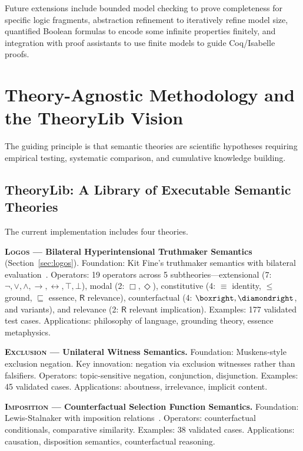 \documentclass[pdflatex,sn-mathphys-num]{sn-jnl}
\newcommand{\nec}{\Box}                     %
\newcommand{\poss}{\Diamond}                %
\newcommand{\imp}{\to}                      %
\newcommand{\lneg}{\neg}                    %
\newcommand{\ground}{\leq}                  %
\newcommand{\essence}{\sqsubseteq}          %
\newcommand{\propident}{\equiv}             %
\newcommand{\relimpl}{\mathsf{R}}           %
\newcommand{\theorylogos}{\textsc{Logos}}
\newcommand{\theoryexclusion}{\textsc{Exclusion}}
\newcommand{\theoryimposition}{\textsc{Imposition}}
\theoremstyle{thmstyleone}
\theoremstyle{thmstyletwo}
\theoremstyle{thmstylethree}
\begin{document}
Future extensions include bounded model checking to prove completeness for specific logic fragments, abstraction refinement to iteratively refine model size, quantified Boolean formulas to encode some infinite properties finitely, and integration with proof assistants to use finite models to guide Coq/Isabelle proofs.


\section{Theory-Agnostic Methodology and the TheoryLib Vision}\label{sec:theorylib}

The guiding principle is that semantic theories are scientific hypotheses requiring empirical testing, systematic comparison, and cumulative knowledge building.

\subsection{TheoryLib: A Library of Executable Semantic Theories}\label{sec:theorylib-library}

The current implementation includes four theories.

\textbf{\theorylogos{} --- Bilateral Hyperintensional Truthmaker Semantics} (Section~\ref{sec:logos}).
Foundation: Kit Fine's truthmaker semantics with bilateral evaluation~\cite{fine2017tms,fine2017content}.
Operators: 19 operators across 5 subtheories---extensional (7: $\lneg, \lor, \land, \imp, \leftrightarrow, \top, \bot$), modal (2: $\nec, \poss$), constitutive (4: $\propident$ identity, $\ground$ ground, $\essence$ essence, $\relimpl$ relevance), counterfactual (4: $\boxright, \diamondright$, and variants), and relevance (2: $\relimpl$ relevant implication).
Examples: 177 validated test cases.
Applications: philosophy of language, grounding theory, essence metaphysics.

\textbf{\theoryexclusion{} --- Unilateral Witness Semantics.}
Foundation: Muskens-style exclusion negation.
Key innovation: negation via exclusion witnesses rather than falsifiers.
Operators: topic-sensitive negation, conjunction, disjunction.
Examples: 45 validated cases.
Applications: aboutness, irrelevance, implicit content.

\textbf{\theoryimposition{} --- Counterfactual Selection Function Semantics.}
Foundation: Lewis-Stalnaker with imposition relations~\cite{lewis1973,stalnaker1968}.
Operators: counterfactual conditionals, comparative similarity.
Examples: 38 validated cases.
Applications: causation, disposition semantics, counterfactual reasoning.
\end{document}
